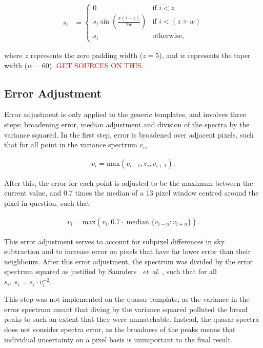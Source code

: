 \documentclass[titlesmallcaps, examinerscopy, copyrightpage]{uqthesis}
\newcommand{\brac}[1]{\left( #1 \right)}
\newcommand {\etal} {\emph{~et~al.} }
\DeclareMathOperator*{\median}{median}
\begin{document}
\begin{align}
s_i &= 
\begin{cases}
	0 & \text{if } i < z \\
	s_i \sin\brac{\frac{\pi (i-z)}{2w}} & \text{if } i < (z+w) \\
	s_i & \text{otherwise},
\end{cases}
\end{align} 

where $z$ represents the zero padding width ($z=5$), and $w$ represents the taper width ($w=60$). \textcolor{red}{GET SOURCES ON THIS.}

\subsection{Error Adjustment}

Error adjustment is only applied to the generic templates, and involves three steps: broadening error, median adjustment and division of the spectra by the variance squared. In the first step, error is broadened over adjacent pixels, such that for all point in the variance spectrum $v_i$, 

\begin{align}
v_i = \mathrm{max}(v_{i-1}, v_i, v_{i+1}).
\end{align}

After this, the error for each point is adjusted to be the maximum between the current value, and 0.7 times the median of a 13 pixel window centred around the pixel in question, such that

\begin{align}
v_i = \mathrm{max}\brac{v_i, 0.7\cdot \median\{v_{i-n}:v_{i+n}\}}.
\end{align}

This error adjustment serves to account for subpixel differences in sky subtraction and to increase error on pixels that have far lower error than their neighbours. After this error adjustment, the spectrum was divided by the error spectrum squared as justified by Saunders \etal \cite{saunders2004improvements}, such that for all $s_i,\ s_i = s_i \cdot v_i^{-2}$.

This step was not implemented on the quasar template, as the variance in the error spectrum meant that diving by the variance squared polluted the broad peaks to such an extent that they were unmatchable. Instead, the quasar spectra does not consider spectra error, as the broadness of the peaks means that individual uncertainty on a pixel basis is unimportant to the final result.
\end{document}

